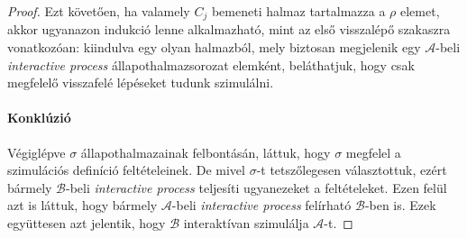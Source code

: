 \documentclass[12pt]{article}
\theoremstyle{definition}
\theoremstyle{remark}
\theoremstyle{plain}
\theoremstyle{remark}
\theoremstyle{plain}
\begin{document}
\begin{proof}
        Ezt követően, ha valamely $C_{j}$ bemeneti halmaz tartalmazza a $\rho$ elemet, akkor ugyanazon indukció lenne alkalmazható, mint az első visszalépő szakaszra vonatkozóan: kiindulva egy olyan halmazból, mely biztosan megjelenik egy $\mathscr{A}$-beli \textit{interactive process} állapothalmazsorozat elemként, beláthatjuk, hogy csak megfelelő visszafelé lépéseket tudunk szimulálni.
        
        \paragraph{Konklúzió}
        Végiglépve $\sigma$ állapothalmazainak felbontásán, láttuk, hogy $\sigma$ megfelel a szimulációs definíció feltételeinek. De mivel $\sigma$-t tetszőlegesen választottuk, ezért bármely $\mathscr{B}$-beli \textit{interactive process} teljesíti ugyanezeket a feltételeket. Ezen felül azt is láttuk, hogy bármely $\mathscr{A}$-beli \textit{interactive process} felírható $\mathscr{B}$-ben is. Ezek együttesen azt jelentik, hogy $\mathscr{B}$ interaktívan szimulálja $\mathscr{A}$-t.
    \end{proof}
\end{document}
